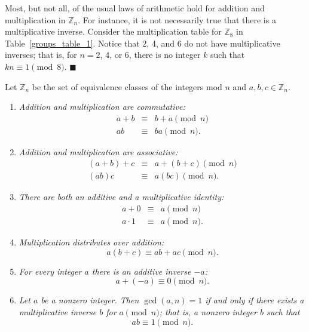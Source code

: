 Most, but not all, of the usual laws of arithmetic hold for addition and multiplication in ${\mathbb Z}_n$.  For instance, it is not necessarily true that there is a multiplicative inverse.  Consider the multiplication table for ${\mathbb Z}_8$ in Table~\ref{groups_table_1}.  Notice that 2, 4, and 6 do not have multiplicative inverses; that is, for $n = 2$, 4, or 6, there is no integer $k$ such that $k n \equiv 1 \pmod{ 8}$.
\mbox{\hspace{2ex}}
\hspace{\fill} $\blacksquare$

\begin{proposition}\label{groups_theorem_1}
Let ${\mathbb Z}_n$ be the set of equivalence classes of the integers mod $n$ and $a, b, c \in {\mathbb Z}_n$.
\begin{enumerate}
 
\rm \item \it %
Addition and multiplication are commutative:
\begin{eqnarray*}
a + b  & \equiv & b + a \pmod{ n} \\
a  b   & \equiv & b  a \pmod{ n}.
\end{eqnarray*}
 
\rm \item \it %
Addition and multiplication are associative:
\begin{eqnarray*}
(a + b) + c  & \equiv & a + (b + c) \pmod{ n} \\
(a  b)  c    & \equiv & a   (b  c)
\pmod{ n}.
\end{eqnarray*}
 
\rm \item \it %
There are both an additive and a multiplicative identity:
\begin{eqnarray*}
a + 0  & \equiv & a \pmod{ n} \\
a \cdot  1  & \equiv & a \pmod{ n}.
\end{eqnarray*} 
 
\rm \item \it %
Multiplication distributes over addition:
$$
a  (b  + c)  \equiv a  b + a  c  \pmod{ n}.
$$ 
 
\rm \item \it %
For every integer $a$ there is an additive inverse $-a$:
$$
a + (-a)  \equiv 0 \pmod{ n}.
$$ 
 
\rm \item \it %
Let $a$ be a nonzero integer.  Then $\gcd(a,n) = 1$ if and only if there exists a multiplicative inverse $b$ for $a \pmod{n}$; that is, a nonzero integer $b$ such that
$$
a  b  \equiv 1 \pmod{ n}.
$$
 
\end{enumerate}
\end{proposition}
 
